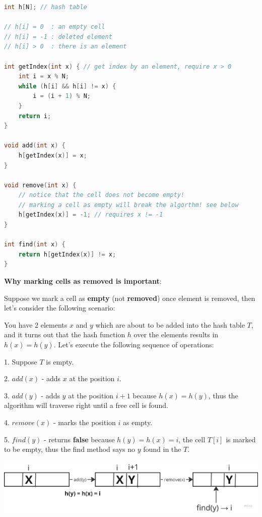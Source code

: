 \begin{lstlisting}[language=C++]
int h[N]; // hash table

// h[i] = 0  : an empty cell
// h[i] = -1 : deleted element
// h[i] > 0  : there is an element

int getIndex(int x) { // get index by an element, require x > 0
    int i = x % N;
    while (h[i] && h[i] != x) {
        i = (i + 1) % N;
    }
    return i;
}

void add(int x) {
    h[getIndex(x)] = x;
}

void remove(int x) {
    // notice that the cell does not become empty!
    // marking a cell as empty will break the algorthm! see below
    h[getIndex(x)] = -1; // requires x != -1
}

int find(int x) {
    return h[getIndex(x)] != x;
}
\end{lstlisting}

\textbf{Why marking cells as removed is important}:

Suppose we mark a cell as \textbf{empty} (not \textbf{removed}) once element is removed, then let's consider the following scenario:

You have $2$ elements $x$ and $y$ which are about to be added into the hash table $T$, and it turns out that the hash function $h$ over the elements results in $h(x) = h(y)$. Let's execute the following sequence of operations:

1. Suppose $T$ is empty.

2. $add(x)$ - adds $x$ at the position $i$.

3. $add(y)$ - adds $y$ at the position $i+1$ because $h(x) = h(y)$, thus the algorithm will traverse right until a free cell is found.

4. $remove(x)$ - marks the position $i$ as empty.

5. $find(y)$ - returns \textbf{false} because $h(y) = h(x) = i$, the cell $T[i]$ is marked to be empty, thus the find method says no $y$ found in the $T$.


\begin{center}
    \includegraphics[scale=0.15]{./assets/11-hash-table/1.png}
\end{center}


